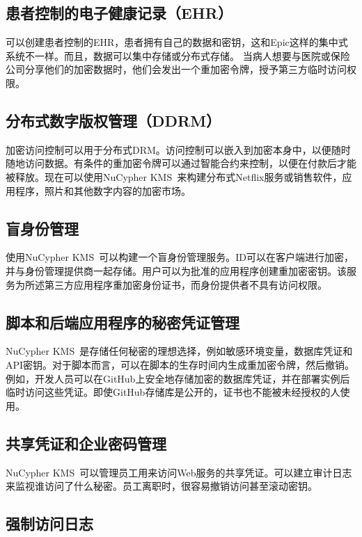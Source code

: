 \documentclass[longbibliography,nofootinbib]{revtex4-1}
\newcommand{\kms}{NuCypher KMS}
\begin{document}
\subsection{患者控制的电子健康记录（EHR）}

    可以创建患者控制的EHR，患者拥有自己的数据和密钥，这和Epic这样的集中式系统不一样。而且，数据可以集中存储或分布式存储。 当病人想要与医院或保险公司分享他们的加密数据时，他们会发出一个重加密令牌，授予第三方临时访问权限。

\subsection{分布式数字版权管理（DDRM）}
\label{sec:drm}

	加密访问控制可以用于分布式DRM。访问控制可以嵌入到加密本身中，以便随时随地访问数据。有条件的重加密令牌可以通过智能合约来控制，以便在付款后才能被释放。现在可以使用\kms~来构建分布式Netflix服务或销售软件，应用程序，照片和其他数字内容的加密市场。

\subsection{盲身份管理}

    使用\kms~可以构建一个盲身份管理服务。ID可以在客户端进行加密，并与身份管理提供商一起存储。用户可以为批准的应用程序创建重加密密钥。该服务为所述第三方应用程序重加密身份证书，而身份提供者不具有访问权限。

\subsection{脚本和后端应用程序的秘密凭证管理}

	\kms~是存储任何秘密的理想选择，例如敏感环境变量，数据库凭证和API密钥。对于脚本而言，可以在脚本的生存时间内生成重加密令牌，然后撤销。例如，开发人员可以在GitHub上安全地存储加密的数据库凭证，并在部署实例后临时访问这些凭证。即使GitHub存储库是公开的，证书也不能被未经授权的人使用。

\subsection{共享凭证和企业密码管理}
	\kms~可以管理员工用来访问Web服务的共享凭证。可以建立审计日志来监视谁访问了什么秘密。员工离职时，很容易撤销访问甚至滚动密钥。

\subsection{强制访问日志}
\end{document}
